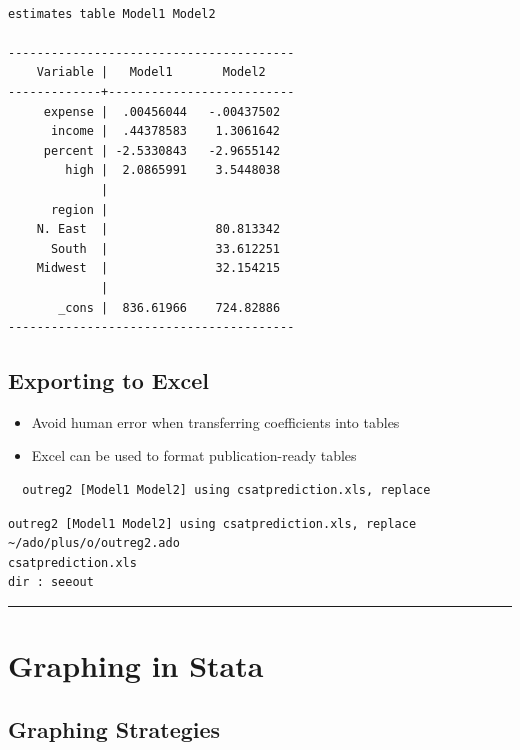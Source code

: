 \documentclass[]{book}
\providecommand{\tightlist}{%
  \setlength{\itemsep}{0pt}\setlength{\parskip}{0pt}}
\begin{document}
\begin{verbatim}

estimates table Model1 Model2

----------------------------------------
    Variable |   Model1       Model2    
-------------+--------------------------
     expense |  .00456044   -.00437502  
      income |  .44378583    1.3061642  
     percent | -2.5330843   -2.9655142  
        high |  2.0865991    3.5448038  
             |
      region |
    N. East  |               80.813342  
      South  |               33.612251  
    Midwest  |               32.154215  
             |
       _cons |  836.61966    724.82886  
----------------------------------------
\end{verbatim}

\subsection{Exporting to Excel}\label{exporting-to-excel}

\begin{itemize}
\tightlist
\item
  Avoid human error when transferring coefficients into tables
\item
  Excel can be used to format publication-ready tables
\end{itemize}

\begin{verbatim}
  outreg2 [Model1 Model2] using csatprediction.xls, replace
\end{verbatim}

\begin{verbatim}
outreg2 [Model1 Model2] using csatprediction.xls, replace
~/ado/plus/o/outreg2.ado
csatprediction.xls
dir : seeout
\end{verbatim}

\begin{center}\rule{0.5\linewidth}{\linethickness}\end{center}

\section{Graphing in Stata}\label{graphing-in-stata}

\subsection{Graphing Strategies}\label{graphing-strategies}
\end{document}
